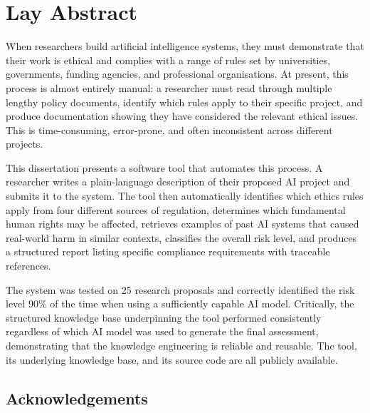 \documentclass[a4paper,oneside,12pt]{book}
\numberwithin{equation}{chapter}
\begin{document}
\chapter*{Lay Abstract}

When researchers build artificial intelligence systems, they must demonstrate that their work is ethical and complies with a range of rules set by universities, governments, funding agencies, and professional organisations. At present, this process is almost entirely manual: a researcher must read through multiple lengthy policy documents, identify which rules apply to their specific project, and produce documentation showing they have considered the relevant ethical issues. This is time-consuming, error-prone, and often inconsistent across different projects.

This dissertation presents a software tool that automates this process. A researcher writes a plain-language description of their proposed AI project and submits it to the system. The tool then automatically identifies which ethics rules apply from four different sources of regulation, determines which fundamental human rights may be affected, retrieves examples of past AI systems that caused real-world harm in similar contexts, classifies the overall risk level, and produces a structured report listing specific compliance requirements with traceable references.

The system was tested on 25 research proposals and correctly identified the risk level 90\% of the time when using a sufficiently capable AI model. Critically, the structured knowledge base underpinning the tool performed consistently regardless of which AI model was used to generate the final assessment, demonstrating that the knowledge engineering is reliable and reusable. The tool, its underlying knowledge base, and its source code are all publicly available.


\newpage
\onehalfspacing\raggedright

\section*{\Huge\textcolor{tcd_blue}{Acknowledgements}}
\end{document}
